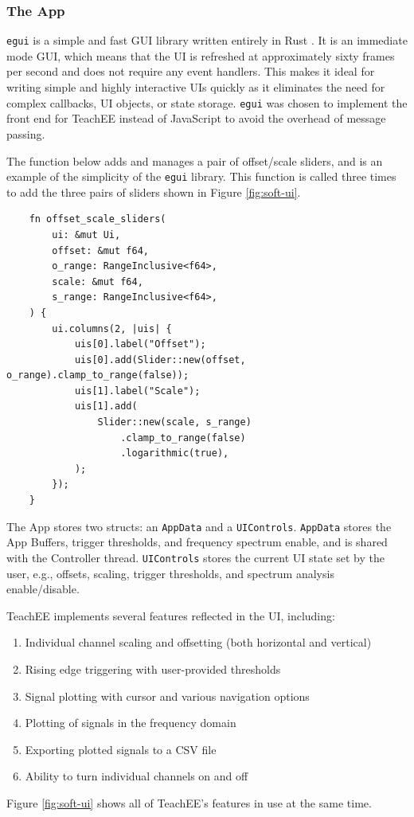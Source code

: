 \documentclass[letterpaper,11pt]{article}
\newcommand{\code}[1]{\texttt{#1}}
\begin{document}
\subsubsection{The App}
\code{egui} is a simple and fast GUI library written entirely in Rust \cite{egui}.
It is an immediate mode GUI, which means that the UI is refreshed at approximately
sixty frames per second and does not require any event handlers. This makes it
ideal for writing simple and highly interactive UIs quickly as it eliminates the
need for complex callbacks, UI objects, or state storage. \code{egui} was chosen to
implement the front end for TeachEE instead of JavaScript to avoid the overhead of
message passing.

The function below adds and manages a pair of offset/scale sliders, and is an example
of the simplicity of the \code{egui} library. This function is called three times to
add the three pairs of sliders shown in Figure \ref{fig:soft-ui}.

\begin{verbatim}
    fn offset_scale_sliders(
        ui: &mut Ui,
        offset: &mut f64,
        o_range: RangeInclusive<f64>,
        scale: &mut f64,
        s_range: RangeInclusive<f64>,
    ) {
        ui.columns(2, |uis| {
            uis[0].label("Offset");
            uis[0].add(Slider::new(offset, o_range).clamp_to_range(false));
            uis[1].label("Scale");
            uis[1].add(
                Slider::new(scale, s_range)
                    .clamp_to_range(false)
                    .logarithmic(true),
            );
        });
    }
\end{verbatim}

The App stores two structs: an \code{AppData} and a \code{UIControls}.
\code{AppData} stores the App Buffers, trigger thresholds, and frequency spectrum
enable, and is shared with the Controller thread. \code{UIControls} stores the
current UI state set by the user, e.g., offsets, scaling, trigger thresholds, and
spectrum analysis enable/disable.

TeachEE implements several features reflected in the UI, including:
\begin{enumerate}
  \item Individual channel scaling and offsetting (both horizontal and vertical)
  \item Rising edge triggering with user-provided thresholds
  \item Signal plotting with cursor and various navigation options
  \item Plotting of signals in the frequency domain
  \item Exporting plotted signals to a CSV file
  \item Ability to turn individual channels on and off
\end{enumerate} 
Figure \ref{fig:soft-ui} shows all of TeachEE's features in use at the same time.
\end{document}
